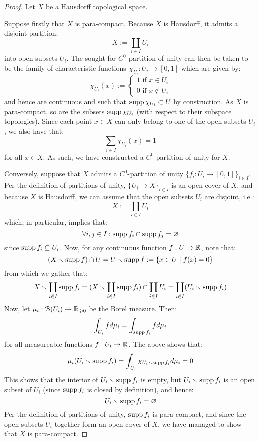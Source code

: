             \begin{proof}
                Let $X$ be a Hausdorff topological space.
            
                Suppose firstly that $X$ is para-compact. Because $X$ is Hausdorff, it admits a disjoint partition:
                    $$X := \coprod_{i \in I} U_i$$
                into open subsets $U_i$. The sought-for $C^0$-partition of unity can then be taken to be the family of characteristic functions $\chi_{U_i}: U_i \to [0, 1]$ which are given by:
                    $$
                        \chi_{U_i}(x) :=
                        \begin{cases}
                            \text{$1$ if $x \in U_i$}
                            \\
                            \text{$0$ if $x \not \in U_i$}
                        \end{cases}
                    $$
                and hence are continuous and such that $\operatorname{supp} \chi_{U_i} \subset U$ by construction. As $X$ is para-compact, so are the subsets $\operatorname{supp} \chi_{U_i}$ (with respect to their subspace topologies). Since each point $x \in X$ can only belong to one of the open subsets $U_i$, we also have that:
                    $$\sum_{i \in I} \chi_{U_i}(x) = 1$$
                for all $x \in X$. As such, we have constructed a $C^0$-partition of unity for $X$.

                Conversely, suppose that $X$ admits a $C^0$-partition of unity $\{f_i: U_i \to [0, 1]\}_{i \in I}$. Per the definition of partitions of unity, $\{U_i \to X\}_{i \in I}$ is an open cover of $X$, and because $X$ is Hausdorff, we can assume that the open subsets $U_i$ are disjoint, i.e.:
                    $$X := \coprod_{i \in I} U_i$$
                which, in particular, implies that:
                    $$\forall i, j \in I: \operatorname{supp} f_i \cap \operatorname{supp} f_j = \varnothing$$
                since $\operatorname{supp} f_i \subseteq U_i$. Now, for any continuous function $f: U \to \mathbb{R}$, note that:
                    $$(X \smallsetminus \operatorname{supp} f) \cap U = U \smallsetminus \operatorname{supp} f := \{ x \in U \mid f(x) = 0 \}$$
                from which we gather that:
                    $$X \smallsetminus \coprod_{i \in I} \operatorname{supp} f_i = (X \smallsetminus \coprod_{i \in I} \operatorname{supp} f_i) \cap \coprod_{i \in I} U_i = \coprod_{i \in I} (U_i \smallsetminus \operatorname{supp} f_i)$$
                Now, let $\mu_i: \mathcal{B}(U_i) \to \mathbb{R}_{\geqslant 0}$ be the Borel measure. Then:
                    $$\int_{U_i} f d\mu_i = \int_{\operatorname{supp} f_i} f d\mu_i$$
                for all measureable functions $f: U_i \to \mathbb{R}$. The above shows that:
                    $$\mu_i(U_i \smallsetminus \operatorname{supp} f_i) = \int_{U_i} \chi_{U_i \smallsetminus \operatorname{supp} f_i} d\mu_i = 0$$
                This shows that the interior of $U_i \smallsetminus \operatorname{supp} f_i$ is empty, but $U_i \smallsetminus \operatorname{supp} f_i$ is an open subset of $U_i$ (since $\operatorname{supp} f_i$ is closed by definition), and hence:
                    $$U_i \smallsetminus \operatorname{supp} f_i = \varnothing$$
                Per the definition of partitions of unity, $\operatorname{supp} f_i$ is para-compact, and since the open subsets $U_i$ together form an open cover of $X$, we have managed to show that $X$ is para-compact.
            \end{proof}
